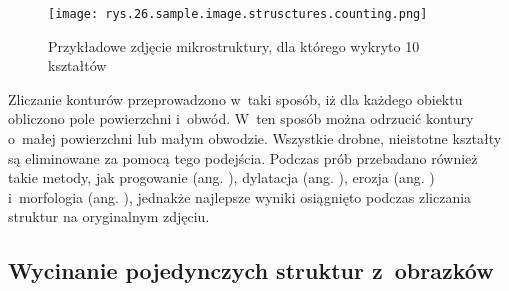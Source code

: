\begin{figure}[h]
    \centering
    \texttt{[image: rys.26.sample.image.strusctures.counting.png]}
    \caption{Przykładowe zdjęcie mikrostruktury, dla którego wykryto 10 kształtów}
    \label{fig:mesh25}
\end{figure}
Zliczanie konturów przeprowadzono w~taki sposób, iż dla każdego obiektu obliczono pole powierzchni i~obwód. W~ten sposób można odrzucić kontury o~małej powierzchni lub małym obwodzie. Wszystkie drobne, nieistotne kształty są eliminowane za pomocą tego podejścia. Podczas prób przebadano również takie metody, jak progowanie (ang. ), dylatacja (ang. ), erozja (ang. ) i~morfologia (ang. ), jednakże najlepsze wyniki osiągnięto podczas zliczania struktur na oryginalnym zdjęciu.

\subsection{Wycinanie pojedynczych struktur z~obrazków}
\label{wycinanie.struktur}

